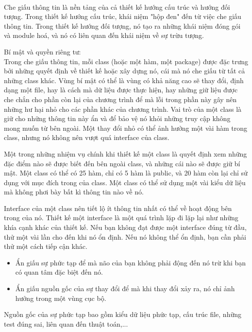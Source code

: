 \documentclass[12pt]{report}
\begin{document}
 \\
Che giấu thông tin là nền tảng của cả thiết kế hướng cấu trúc và hướng đối tượng. Trong thiết kế hướng cấu trúc, khái niệm "hộp đen" đến từ việc che giấu thông tin. Trong thiết kế hướng đối tượng, nó tạo ra những khái niệm đóng gói và module hoá, và nó có liên quan đến khái niệm về sự trừu tượng. 


Bí mật và quyền riêng tư: \\
Trong che giấu thông tin, mỗi class (hoặc một hàm, một package) được đặc trưng bởi những quyết định về thiết kế hoặc xây dựng nó, cái mà nó che giấu từ tất cả những class khác. Vùng bí mật có thể là vùng có khả năng cao sẽ thay đổi, định dạng một file, hay là cách mà dữ liệu được thực hiện, hay những giữ liệu được che chắn cho phần còn lại của chương trình để mà lỗi trong phần này gây nên những hư hại nhỏ cho các phần khác của chương trình. Vai trò của một class là giữ cho những thông tin này ẩn và để bảo vệ nó khỏi những truy cập không mong muốn từ bên ngoài. Một thay đổi nhỏ có thể ảnh hưởng một vài hàm trong class, nhưng nó không nên vượt quá interface của class. 

Một trong những nhiệm vụ chính khi thiết kế một class là quyết định xem những đặc điểm nào sẽ được biết đến bên ngoài class, và những cái nào sẽ được giữ bí mật. Một class có thể có 25 hàm, chỉ có 5 hàm là public, và 20 hàm còn lại chỉ sử dụng với mục đích trong của class. Một class có thể sử dụng một vài kiểu dữ liệu mà không phơi bày bất kì thông tin nào về nó. 

Interface của một class nên tiết lộ ít thông tin nhất có thể về hoạt động bên trong của nó. Thiết kế một interface là một quá trình lặp đi lặp lại như những khía cạnh khác của thiết kế. Nếu bạn không đạt được một interface đúng từ đầu, thử một vài lần cho đến khi nó ổn định. Nếu nó không thể ổn định, bạn cần phải thử một cách tiếp cận khác. 

\begin{itemize}
	\item Ẩn giấu sự phức tạp để mà não của bạn không phải động đến nó trừ khi bạn có quan tâm đặc biệt đến nó. 
	\item Ẩn giấu nguồn gốc của sự thay đổi để mà khi thay đổi xảy ra, nó chỉ ảnh hưởng trong một vùng cục bộ. 
\end{itemize}  
Nguồn gốc của sự phức tạp bao gồm kiểu dữ liệu phức tạp, cấu trúc file, những test đúng sai, liên quan đến thuật toán,...
\vspace*{3mm}
\end{document}
